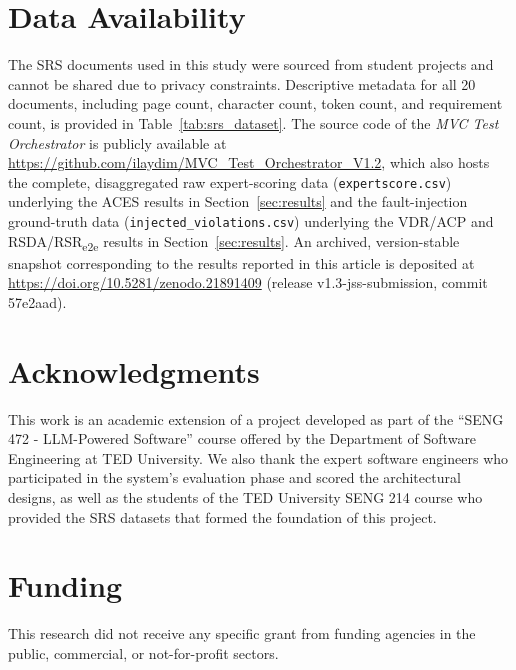 \documentclass[a4paper,fleqn]{cas-sc}
\begin{document}










\section*{Data Availability}
The SRS documents used in this study were sourced from
student projects and cannot be shared due to
privacy constraints. Descriptive metadata for all 20 documents,
including page count, character count, token count, and
requirement count, is provided in
Table~\ref{tab:srs_dataset}.  The source code of the \textit{MVC
Test Orchestrator} is publicly available at
\url{https://github.com/ilaydim/MVC_Test_Orchestrator_V1.2}, which also
hosts the complete, disaggregated raw expert-scoring data
(\texttt{expertscore.csv}) underlying the ACES results in Section~\ref{sec:results} and
the fault-injection ground-truth data (\texttt{injected\_violations.csv})
underlying the VDR/ACP and RSDA/RSR\textsubscript{e2e} results in
Section~\ref{sec:results}. An archived, version-stable snapshot corresponding to the
results reported in this article is deposited at
\url{https://doi.org/10.5281/zenodo.21891409} (release
v1.3-jss-submission, commit 57e2aad).

\section*{Acknowledgments}

This work is an academic extension of a project developed as part of the ``SENG 472 - LLM-Powered Software'' course offered by the Department of Software Engineering at TED University. We also thank the expert software engineers who participated in the system's evaluation phase and scored the architectural designs, as well as the students of the TED University SENG 214 course who provided the SRS datasets that formed the foundation of this project.

\section*{Funding}

This research did not receive any specific grant from funding agencies in the public, commercial, or not-for-profit sectors.
\end{document}
